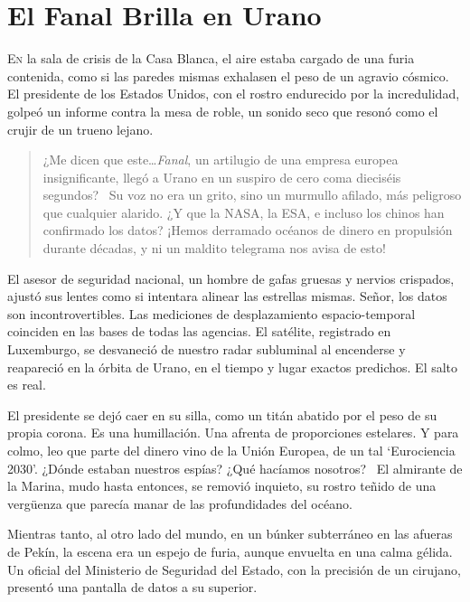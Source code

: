 
\chapter{El Fanal Brilla en Urano}

\lettrine[lines=2, loversize=0.3, lraise=0]{E}{n} la sala de crisis de la Casa Blanca, el aire estaba cargado de una furia contenida, como si las paredes mismas exhalasen el peso de un agravio cósmico. El presidente de los Estados Unidos, con el rostro endurecido por la incredulidad, golpeó un informe contra la mesa de roble, un sonido seco que resonó como el crujir de un trueno lejano.

\begin{quote}
\calli
\glqq ¿Me dicen que este\ldots \emph{Fanal}, un artilugio de una empresa europea insignificante, llegó a Urano en un suspiro de cero coma dieciséis segundos?\grqq~ Su voz no era un grito, sino un murmullo afilado, más peligroso que cualquier alarido. \glqq ¿Y que la NASA, la ESA, e incluso los chinos han confirmado los datos? ¡Hemos derramado océanos de dinero en propulsión durante décadas, y ni un maldito telegrama nos avisa de esto!\grqq
\end{quote}

El asesor de seguridad nacional, un hombre de gafas gruesas y nervios crispados, ajustó sus lentes como si intentara alinear las estrellas mismas. \glqq Señor, los datos son incontrovertibles. Las mediciones de desplazamiento espacio-temporal coinciden en las bases de todas las agencias. El satélite, registrado en Luxemburgo, se desvaneció de nuestro radar subluminal al encenderse y reapareció en la órbita de Urano, en el tiempo y lugar exactos predichos. El salto es real.\grqq

El presidente se dejó caer en su silla, como un titán abatido por el peso de su propia corona. \glqq Es una humillación. Una afrenta de proporciones estelares. Y para colmo, leo que parte del dinero vino de la Unión Europea, de un tal `Eurociencia 2030'. ¿Dónde estaban nuestros espías? ¿Qué hacíamos nosotros?\grqq~ El almirante de la Marina, mudo hasta entonces, se removió inquieto, su rostro teñido de una vergüenza que parecía manar de las profundidades del océano.

Mientras tanto, al otro lado del mundo, en un búnker subterráneo en las afueras de Pekín, la escena era un espejo de furia, aunque envuelta en una calma gélida. Un oficial del Ministerio de Seguridad del Estado, con la precisión de un cirujano, presentó una pantalla de datos a su superior.

